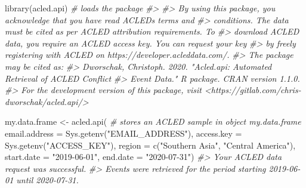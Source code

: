 \documentclass[
]{article}
\newenvironment{Shaded}{\begin{snugshade}}{\end{snugshade}}
\newcommand{\AttributeTok}[1]{\textcolor[rgb]{0.77,0.63,0.00}{#1}}
\newcommand{\CommentTok}[1]{\textcolor[rgb]{0.56,0.35,0.01}{\textit{#1}}}
\newcommand{\FunctionTok}[1]{\textcolor[rgb]{0.00,0.00,0.00}{#1}}
\newcommand{\NormalTok}[1]{#1}
\newcommand{\OtherTok}[1]{\textcolor[rgb]{0.56,0.35,0.01}{#1}}
\newcommand{\StringTok}[1]{\textcolor[rgb]{0.31,0.60,0.02}{#1}}
\begin{document}
\begin{Shaded}
\begin{Highlighting}[]
\FunctionTok{library}\NormalTok{(acled.api) }\CommentTok{\# loads the package}
\CommentTok{\#\textgreater{} }
\CommentTok{\#\textgreater{} By using this package, you acknowledge that you have read ACLED\textquotesingle{}s terms and}
\CommentTok{\#\textgreater{} conditions. The data must be cited as per ACLED attribution requirements. To}
\CommentTok{\#\textgreater{} download ACLED data, you require an ACLED access key. You can request your key}
\CommentTok{\#\textgreater{} by freely registering with ACLED on https://developer.acleddata.com/.}
\CommentTok{\#\textgreater{} The package may be cited as:}
\CommentTok{\#\textgreater{} Dworschak, Christoph. 2020. "Acled.api: Automated Retrieval of ACLED Conflict}
\CommentTok{\#\textgreater{} Event Data." R package. CRAN version 1.1.0.}
\CommentTok{\#\textgreater{} For the development version of this package, visit \textless{}https://gitlab.com/chris{-}dworschak/acled.api/\textgreater{}}

\NormalTok{my.data.frame }\OtherTok{\textless{}{-}} \FunctionTok{acled.api}\NormalTok{( }\CommentTok{\# stores an ACLED sample in object my.data.frame}
  \AttributeTok{email.address =} \FunctionTok{Sys.getenv}\NormalTok{(}\StringTok{"EMAIL\_ADDRESS"}\NormalTok{),}
  \AttributeTok{access.key =} \FunctionTok{Sys.getenv}\NormalTok{(}\StringTok{"ACCESS\_KEY"}\NormalTok{),}
  \AttributeTok{region =} \FunctionTok{c}\NormalTok{(}\StringTok{"Southern Asia"}\NormalTok{, }\StringTok{"Central America"}\NormalTok{), }
  \AttributeTok{start.date =} \StringTok{"2019{-}06{-}01"}\NormalTok{, }
  \AttributeTok{end.date =} \StringTok{"2020{-}07{-}31"}\NormalTok{)}
\CommentTok{\#\textgreater{} Your ACLED data request was successful. }
\CommentTok{\#\textgreater{} Events were retrieved for the period starting 2019{-}06{-}01 until 2020{-}07{-}31.}


\end{Highlighting}
\end{Shaded}
\end{document}
